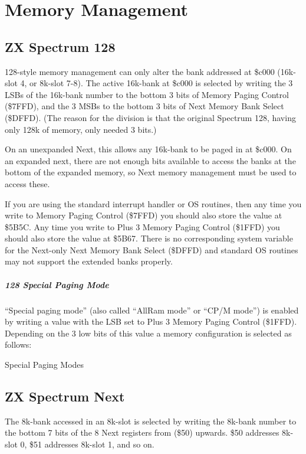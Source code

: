 \chapter{Memory Management}
\section{ZX Spectrum 128}
128-style memory management can only alter the bank addressed at
\$c000 (16k-slot 4, or 8k-slot 7-8). The active 16k-bank at \$c000 is
selected by writing the 3 LSBs of the 16k-bank number to the bottom 3
bits of Memory Paging Control (\$7FFD), and the 3 MSBs to the bottom 3
bits of Next Memory Bank Select (\$DFFD). (The reason for the division
is that the original Spectrum 128, having only 128k of memory, only
needed 3 bits.)

On an unexpanded Next, this allows any 16k-bank to be paged in at
\$c000. On an expanded next, there are not enough bits available to
access the banks at the bottom of the expanded memory, so Next memory
management must be used to access these.

If you are using the standard interrupt handler or OS routines, then
any time you write to Memory Paging Control (\$7FFD) you should also
store the value at \$5B5C. Any time you write to Plus 3 Memory Paging
Control (\$1FFD) you should also store the value at \$5B67. There is
no corresponding system variable for the Next-only Next Memory Bank
Select (\$DFFD) and standard OS routines may not support the extended
banks properly.

\paragraph{128 Special Paging Mode}

``Special paging mode'' (also called ``AllRam mode'' or ``CP/M mode'')
is enabled by writing a value with the LSB set to Plus 3 Memory Paging
Control (\$1FFD). Depending on the 3 low bits of this value a memory
configuration is selected as follows:

\begin{table}[h]\centering
  \caption{Special Paging Modes}
\end{table}

\section{ZX Spectrum Next}
The 8k-bank accessed in an 8k-slot is selected by writing the 8k-bank
number to the bottom 7 bits of the 8 Next registers from (\$50)
upwards. \$50 addresses 8k-slot 0, \$51 addresses 8k-slot 1, and so
on.

